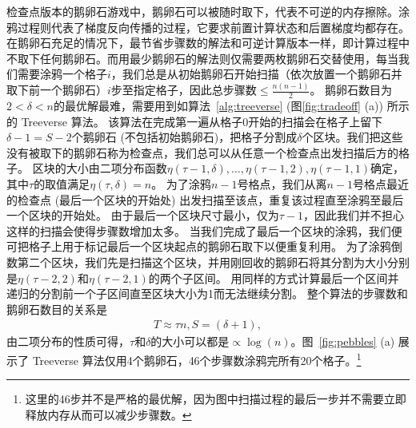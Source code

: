 \documentclass[A4,twoside,UTF8]{ctexart}
\begin{document}
检查点版本的鹅卵石游戏中，鹅卵石可以被随时取下，代表不可逆的内存擦除。涂鸦过程则代表了梯度反向传播的过程，它要求前置计算状态和后置梯度均都存在。在鹅卵石充足的情况下，最节省步骤数的解法和可逆计算版本一样，即计算过程中不取下任何鹅卵石。而用最少鹅卵石的解法则仅需要两枚鹅卵石交替使用，每当我们需要涂鸦一个格子$i$，我们总是从初始鹅卵石开始扫描（依次放置一个鹅卵石并取下前一个鹅卵石）$i$步至指定格子，因此总步骤数$\leq\frac{n(n-1)}{2}$。
鹅卵石数目为$2<\delta<n$的最优解最难，需要用到如算法~\ref{alg:treeverse} (图\ref{fig:tradeoff} (a)) 所示的 Treeverse 算法。
该算法在完成第一遍从格子$0$开始的扫描会在格子上留下$\delta-1=S-2$个鹅卵石 (不包括初始鹅卵石)，把格子分割成$\delta$个区块。我们把这些没有被取下的鹅卵石称为检查点，我们总可以从任意一个检查点出发扫描后方的格子。
区块的大小由二项分布函数$\eta(\tau-1, \delta), \ldots, \eta(\tau-1, 2), \eta(\tau-1, 1)$确定，其中$\tau$的取值满足$\eta(\tau, \delta) = n$。
为了涂鸦$n-1$号格点，我们从离$n-1$号格点最近的检查点 (最后一个区块的开始处) 出发扫描至该点，重复该过程直至涂鸦至最后一个区块的开始处。
由于最后一个区块尺寸最小，仅为$\tau-1$，因此我们并不担心这样的扫描会使得步骤数增加太多。
当我们完成了最后一个区块的涂鸦，我们便可把格子上用于标记最后一个区块起点的鹅卵石取下以便重复利用。
为了涂鸦倒数第二个区块，我们先是扫描这个区块，并用刚回收的鹅卵石将其分割为大小分别是$\eta(\tau-2, 2)$和$\eta(\tau-2, 1)$的两个子区间。
用同样的方式计算最后一个区间并递归的分割前一个子区间直至区块大小为1而无法继续分割。
整个算法的步骤数和鹅卵石数目的关系是
\begin{align}
    T \approx \tau n, S = (\delta+1),
\end{align}
由二项分布的性质可得，$\tau$和$\delta$的大小可以都是$\propto\log(n)$。图~\ref{fig:pebbles} (a) 展示了 Treeverse 算法仅用4个鹅卵石，46个步骤数涂鸦完所有20个格子。\footnote{这里的46步并不是严格的最优解，因为图中扫描过程的最后一步并不需要立即释放内存从而可以减少步骤数。}
\end{document}
